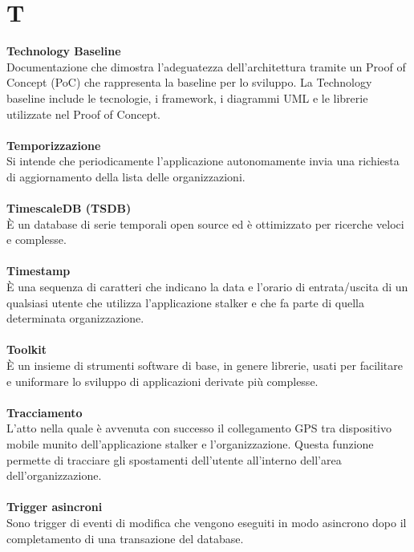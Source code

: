 \section{T}
\textbf{Technology Baseline}\\
Documentazione che dimostra l'adeguatezza dell'architettura tramite un Proof of Concept (PoC) che rappresenta la baseline per lo sviluppo. La Technology baseline include le tecnologie, i framework, i diagrammi UML e le librerie utilizzate nel Proof of Concept. \\ \\
\textbf{Temporizzazione}\\
Si intende che periodicamente l'applicazione autonomamente invia una richiesta di aggiornamento della lista delle organizzazioni. \\ \\
\textbf{TimescaleDB (TSDB)}\\
È un database di serie temporali open source ed è ottimizzato per ricerche veloci e complesse. \\ \\
\textbf{Timestamp}\\
È una sequenza di caratteri che indicano la data e l'orario di entrata/uscita di un qualsiasi utente che utilizza l'applicazione stalker e che fa parte di quella determinata organizzazione. \\ \\
\textbf{Toolkit}\\
È un insieme di strumenti software di base, in genere librerie, usati per facilitare e uniformare lo sviluppo di applicazioni derivate più complesse. \\ \\
\textbf{Tracciamento}\\ 
L'atto nella quale è avvenuta con successo il collegamento GPS tra dispositivo mobile munito dell'applicazione stalker e l'organizzazione. Questa funzione permette di tracciare gli spostamenti dell'utente all'interno dell'area dell'organizzazione. \\ \\
\textbf{Trigger asincroni}\\
Sono trigger di eventi di modifica che vengono eseguiti in modo asincrono dopo il completamento di una transazione del database. \\ \\
\clearpage